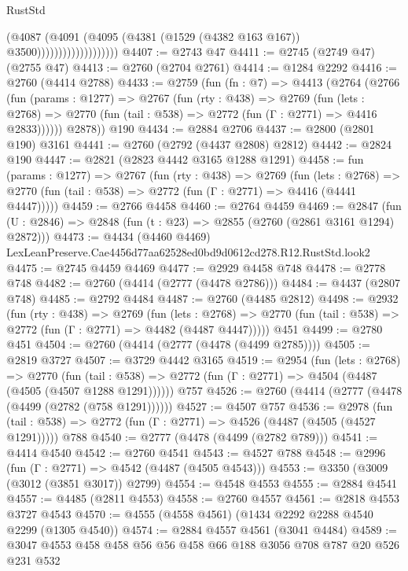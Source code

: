 \begin{lexlean}{RustStd}
\begin{coremodule}
                                  (@4087
                                    (@4091
                                      (@4095
                                        (@4381 (@1529 (@4382 @163 @167)) @3500)))))))))))))))))))
@4407 := @2743 @47
@4411 := @2745 (@2749 @47) (@2755 @47)
@4413 := @2760 (@2704 @2761)
@4414 := @1284 @2292
@4416 := @2760 (@4414 @2788)
@4433 := @2759
    (fun (fn : @7) =>
    @4413
      (@2764
        (@2766
          (fun (params : @1277) =>
          @2767
            (fun (rty : @438) =>
            @2769
              (fun (lets : @2768) =>
              @2770 (fun (tail : @538) => @2772 (fun (Γ : @2771) => @4416 @2833))))))
        @2878))
    @190
@4434 := @2884 @2706
@4437 := @2800 (@2801 @190) @3161
@4441 := @2760 (@2792 (@4437 @2808) @2812)
@4442 := @2824 @190
@4447 := @2821 (@2823 @4442 @3165 @1288 @1291)
@4458 := fun (params : @1277) =>
  @2767
    (fun (rty : @438) =>
    @2769
      (fun (lets : @2768) =>
      @2770 (fun (tail : @538) => @2772 (fun (Γ : @2771) => @4416 (@4441 @4447)))))
@4459 := @2766 @4458
@4460 := @2764 @4459
@4469 := @2847 (fun (U : @2846) => @2848 (fun (t : @23) => @2855 (@2760 (@2861 @3161 @1294) @2872)))
@4473 := @4434 (@4460 @4469) LexLeanPreserve.Cae4456d77aa62528ed0bd9d0612cd278.R12.RustStd.look2
@4475 := @2745 @4459 @4469
@4477 := @2929 @4458 @748
@4478 := @2778 @748
@4482 := @2760 (@4414 (@2777 (@4478 @2786)))
@4484 := @4437 (@2807 @748)
@4485 := @2792 @4484
@4487 := @2760 (@4485 @2812)
@4498 := @2932
    (fun (rty : @438) =>
    @2769
      (fun (lets : @2768) =>
      @2770 (fun (tail : @538) => @2772 (fun (Γ : @2771) => @4482 (@4487 @4447)))))
    @451
@4499 := @2780 @451
@4504 := @2760 (@4414 (@2777 (@4478 (@4499 @2785))))
@4505 := @2819 @3727
@4507 := @3729 @4442 @3165
@4519 := @2954
    (fun (lets : @2768) =>
    @2770
      (fun (tail : @538) => @2772 (fun (Γ : @2771) => @4504 (@4487 (@4505 (@4507 @1288 @1291))))))
    @757
@4526 := @2760 (@4414 (@2777 (@4478 (@4499 (@2782 (@758 @1291))))))
@4527 := @4507 @757
@4536 := @2978
    (fun (tail : @538) => @2772 (fun (Γ : @2771) => @4526 (@4487 (@4505 (@4527 @1291)))))
    @788
@4540 := @2777 (@4478 (@4499 (@2782 @789)))
@4541 := @4414 @4540
@4542 := @2760 @4541
@4543 := @4527 @788
@4548 := @2996 (fun (Γ : @2771) => @4542 (@4487 (@4505 @4543)))
@4553 := @3350 (@3009 (@3012 (@3851 @3017)) @2799)
@4554 := @4548 @4553
@4555 := @2884 @4541
@4557 := @4485 (@2811 @4553)
@4558 := @2760 @4557
@4561 := @2818 @4553 @3727 @4543
@4570 := @4555 (@4558 @4561) (@1434 @2292 @2288 @4540 @2299 (@1305 @4540))
@4574 := @2884 @4557 @4561 (@3041 @4484)
@4589 := @3047 @4553 @458 @458 @56 @56 @458 @66 @188 @3056 @708 @787 @20 @526 @231 @532

\end{coremodule}
\end{lexlean}
